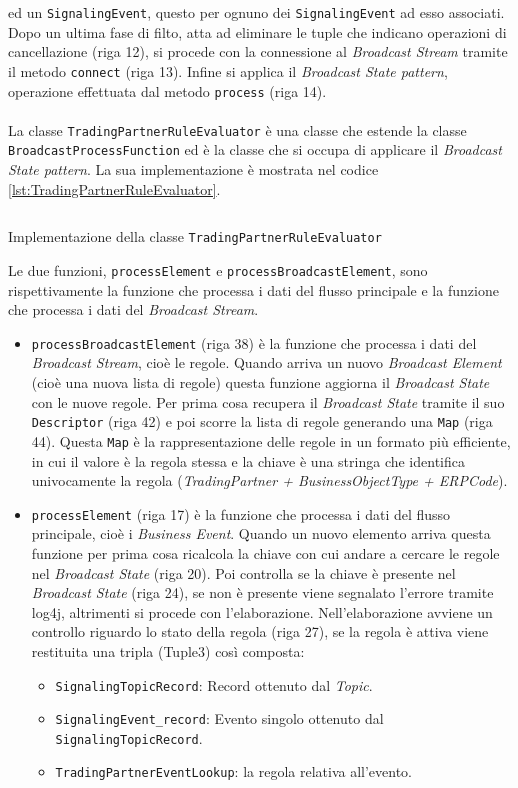 ed un \texttt{SignalingEvent}, questo per ognuno dei \texttt{SignalingEvent} ad esso associati.
Dopo un ultima fase di filto, atta ad eliminare le tuple che indicano operazioni di cancellazione (riga 12), si procede con la connessione al \textit{Broadcast Stream}
tramite il metodo \texttt{connect} (riga 13).
Infine si applica il \textit{Broadcast State pattern}, operazione effettuata dal metodo \texttt{process} (riga 14).\\\\
La classe \texttt{TradingPartnerRuleEvaluator} è una classe che estende la classe \texttt{BroadcastProcessFunction} ed è la classe che si occupa di applicare il \textit{Broadcast State pattern}.
La sua implementazione è mostrata nel codice \ref{lst:TradingPartnerRuleEvaluator}.
\begin{code}
    \inputminted[linenos,fontsize=\footnotesize]{java}{listings/EventsExport/TradingPartnerRuleEvaluator.java}
    \caption{Implementazione della classe \texttt{TradingPartnerRuleEvaluator}}
    \label{lst:TradingPartnerRuleEvaluator}
\end{code}
Le due funzioni, \texttt{processElement} e \texttt{processBroadcastElement}, sono rispettivamente la funzione che processa i dati del flusso principale e la funzione che processa i dati del \textit{Broadcast Stream}.
\begin{itemize}
    \item \texttt{processBroadcastElement} (riga 38) è la funzione che processa i dati del \textit{Broadcast Stream}, cioè le regole.
    Quando arriva un nuovo \textit{Broadcast Element} (cioè una nuova lista di regole) questa funzione aggiorna il \textit{Broadcast State} con le nuove regole.
    Per prima cosa recupera il \textit{Broadcast State} tramite il suo \texttt{Descriptor} (riga 42) e poi scorre la lista di regole generando una \texttt{Map} (riga 44).
    Questa \texttt{Map} è la rappresentazione delle regole in un formato più efficiente, in cui il valore è la regola stessa e la chiave è una stringa che identifica univocamente la regola
    (\textit{TradingPartner + BusinessObjectType + ERPCode}).
    \item \texttt{processElement} (riga 17) è la funzione che processa i dati del flusso principale, cioè i \textit{Business Event}.
    Quando un nuovo elemento arriva questa funzione per prima cosa ricalcola la chiave con cui andare a cercare le regole nel \textit{Broadcast State} (riga 20).
    Poi controlla se la chiave è presente nel \textit{Broadcast State} (riga 24), se non è presente viene segnalato l'errore tramite log4j, altrimenti si procede con l'elaborazione.
    Nell'elaborazione avviene un controllo riguardo lo stato della regola (riga 27), se la regola è attiva viene restituita una tripla (Tuple3) così composta:
    \begin{itemize}
        \item \texttt{SignalingTopicRecord}: Record ottenuto dal \textit{Topic}.
        \item \texttt{SignalingEvent\_record}: Evento singolo ottenuto dal \texttt{Signaling\-Topic\-Record}.
        \item \texttt{TradingPartnerEventLookup}: la regola relativa all'evento.
    \end{itemize}
\end{itemize}